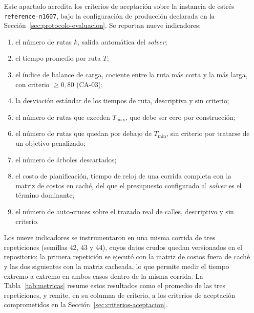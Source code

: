 Este apartado acredita los criterios de aceptación sobre la instancia de estrés
\texttt{reference-n1607}, bajo la configuración de producción declarada en la
Sección~\ref{sec:protocolo-evaluacion}. Se reportan nueve indicadores:
\begin{enumerate}[label=\alph*)]
  \item el número de rutas $k$, salida automática del \textit{solver};
  \item el tiempo promedio por ruta $\bar{T}$;
  \item el índice de balance de carga, cociente entre la ruta más corta y la más
    larga, con criterio $\geq 0{,}80$ (CA-03);
  \item la desviación estándar de los tiempos de ruta, descriptiva y sin criterio;
  \item el número de rutas que exceden $T_{\max}$, que debe ser cero por
    construcción;
  \item el número de rutas que quedan por debajo de $T_{\min}$, sin criterio por
    tratarse de un objetivo penalizado;
  \item el número de árboles descartados;
  \item el costo de planificación, tiempo de reloj de una corrida completa con la matriz de costos
    en caché, del que el presupuesto configurado al \textit{solver} es el término dominante;
  \item el número de auto-cruces sobre el trazado real de calles, descriptivo y sin criterio.
\end{enumerate}

Los nueve indicadores se instrumentaron en una misma corrida de tres repeticiones (semillas 42, 43
y 44), cuyos datos crudos quedan
versionados en el repositorio; la primera repetición se ejecutó con la
matriz de costos fuera de caché y las dos siguientes con la matriz cacheada, lo que permite medir
el tiempo extremo a extremo en ambos casos dentro de la misma corrida. La
Tabla~\ref{tab:metricas} resume estos resultados como el promedio de las tres repeticiones, y
remite, en su columna de criterio, a los criterios de aceptación comprometidos en la
Sección~\ref{sec:criterios-aceptacion}.

